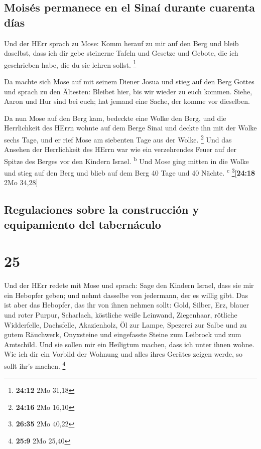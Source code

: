 \hypertarget{moisuxe9s-permanece-en-el-sinauxed-durante-cuarenta-duxedas}{%
\subsection{Moisés permanece en el Sinaí durante cuarenta
días}\label{moisuxe9s-permanece-en-el-sinauxed-durante-cuarenta-duxedas}}

 Und der HErr sprach zu Mose: Komm herauf zu mir auf den
Berg und bleib daselbst, dass ich dir gebe steinerne Tafeln und Gesetze
und Gebote, die ich geschrieben habe, die du sie lehren sollst.
\footnote{\textbf{24:12} 2Mo 31,18}

 Da machte sich Mose auf mit seinem Diener Josua und
stieg auf den Berg Gottes  und sprach zu den Ältesten:
Bleibet hier, bis wir wieder zu euch kommen. Siehe, Aaron und Hur sind
bei euch; hat jemand eine Sache, der komme vor dieselben.

 Da nun Mose auf den Berg kam, bedeckte eine Wolke den
Berg,  und die Herrlichkeit des HErrn wohnte auf dem
Berge Sinai und deckte ihn mit der Wolke sechs Tage, und er rief Mose am
siebenten Tage aus der Wolke. \footnote{\textbf{24:16} 2Mo 16,10}
 Und das Ansehen der Herrlichkeit des HErrn war wie ein
verzehrendes Feuer auf der Spitze des Berges vor den Kindern Israel.
\textsuperscript{b}  Und Mose ging mitten in die Wolke
und stieg auf den Berg und blieb auf dem Berg 40 Tage und 40 Nächte.
\textsuperscript{c} \footnote{\textbf{26:35} 2Mo 40,22}{[}\textbf{24:18}
2Mo 34,28{]}

\hypertarget{regulaciones-sobre-la-construcciuxf3n-y-equipamiento-del-tabernuxe1culo}{%
\subsection{Regulaciones sobre la construcción y equipamiento del
tabernáculo}\label{regulaciones-sobre-la-construcciuxf3n-y-equipamiento-del-tabernuxe1culo}}

\hypertarget{section-24}{%
\section{25}\label{section-24}}

 Und der HErr redete mit Mose und sprach: 
Sage den Kindern Israel, dass sie mir ein Hebopfer geben; und nehmt
dasselbe von jedermann, der es willig gibt.  Das ist aber
das Hebopfer, das ihr von ihnen nehmen sollt: Gold, Silber, Erz,
 blauer und roter Purpur, Scharlach, köstliche weiße
Leinwand, Ziegenhaar,  rötliche Widderfelle, Dachsfelle,
Akazienholz,  Öl zur Lampe, Spezerei zur Salbe und zu
gutem Räuchwerk,  Onyxsteine und eingefasste Steine zum
Leibrock und zum Amtschild.  Und sie sollen mir ein
Heiligtum machen, dass ich unter ihnen wohne.  Wie ich dir
ein Vorbild der Wohnung und alles ihres Gerätes zeigen werde, so sollt
ihr's machen. \footnote{\textbf{25:9} 2Mo 25,40}

